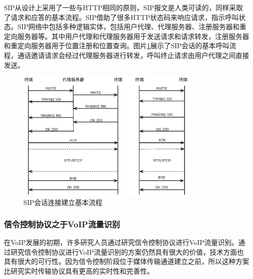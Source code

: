 SIP从设计上采用了一些与HTTP相同的原则，SIP报文是人类可读的，同样采取了请求和应答的基本流程。SIP借助了很多HTTP状态码来响应请求，指示呼叫状态。SIP网络中包括多种逻辑实体，包括用户代理、代理服务器、注册服务器和重定向服务器等。其中用户代理和代理服务器用于发送请求和请求转发，注册服务器和重定向服务器用于位置注册和位置查询。图片\ref{fig:SIP}展示了SIP会话的基本呼叫流程，通话邀请请求会经过代理服务器进行转发，呼叫终止请求由用户代理之间直接发送。

\begin{figure}[thb]
\begin{center}
\includegraphics[width=0.8\textwidth]{figures/SIP.eps}
\caption{SIP会话连接建立基本流程}\label{fig:SIP}
\end{center}
\end{figure}


\subsubsection{信令控制协议之于VoIP流量识别}
在VoIP发展的初期，许多研究人员通过研究信令控制协议进行VoIP流量识别。通过研究信令控制协议进行VoIP流量识别的方案仍然具有很大的价值，技术方面也具有很大的可行性。因为信令控制阶段位于媒体传输通道建立之前，所以这种方案比研究实时传输协议具有更高的实时性和完善性。

